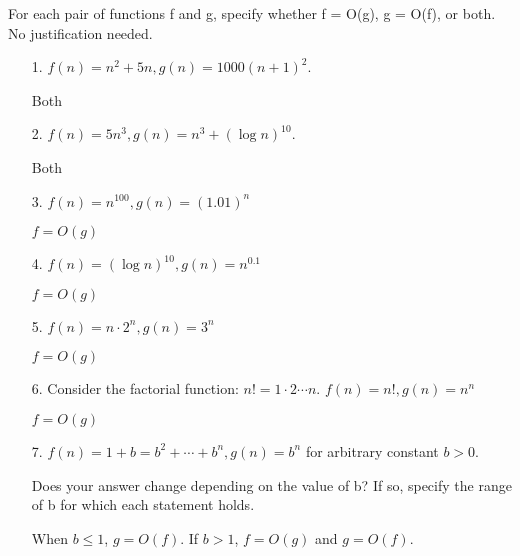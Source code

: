 \documentclass{article}
\begin{document}
For each pair of functions f and g, specify whether f = O(g), g = O(f), or both. No justification needed.
    \begin{itemize}
        \item [1.] $f(n) = n^{2} + 5n, g(n) = 1000(n + 1)^{2}$.
            \begin{answer}
                Both
            \end{answer}

        \item [2.] $f(n) = 5n^{3}, g(n) = n^{3} + (\log{n})^{10}$.
            \begin{answer}
                Both
            \end{answer}

        \item [3.] $f(n) = n^{100}, g(n) = (1.01)^{n}$
            \begin{answer}
                $f = O(g)$
            \end{answer}

        \item [4.] $f(n) = (\log{n})^{10}, g(n) = n^{0.1}$
            \begin{answer}
                $f = O(g)$
            \end{answer}

        \item [5.] $f(n) = n \cdot 2^{n}, g(n) = 3^{n}$
            \begin{answer}
                $f = O(g)$
            \end{answer}

        \item [6.] Consider the factorial function: $n! = 1 \cdot 2 \cdots n$. $f(n) = n!, g(n) = n^{n}$
            \begin{answer}
                $f = O(g)$
            \end{answer}

        \item [7.] $f(n) = 1 + b = b^{2} + \cdots + b^{n}, g(n) = b^{n}$ for arbitrary constant $b > 0$.

        Does your answer change depending on the value of b? If so, specify the range of b for which each statement holds.

        \begin{answer}
            When $b \leq 1$, $g = O(f)$. If $b > 1$, $f = O(g)$ and $g = O(f)$.
        \end{answer}
    \end{itemize}
\end{document}
